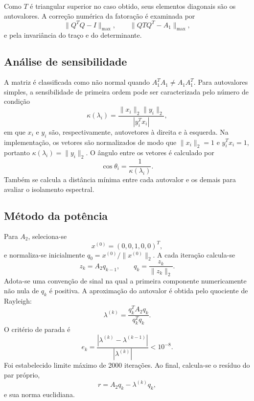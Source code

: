 Como \(T\) é triangular superior no caso obtido, seus elementos diagonais são os autovalores. A correção numérica da fatoração é examinada por
\[
\|Q^TQ-I\|_{\max},\qquad
\|QTQ^T-A_1\|_{\max},
\]
e pela invariância do traço e do determinante.

\subsection{Análise de sensibilidade}

A matriz é classificada como não normal quando \(A_1^TA_1\neq A_1A_1^T\). Para autovalores simples, a sensibilidade de primeira ordem pode ser caracterizada pelo número de condição
\[
\kappa(\lambda_i)=
\frac{\|x_i\|_2\|y_i\|_2}{|y_i^Tx_i|},
\]
em que \(x_i\) e \(y_i\) são, respectivamente, autovetores à direita e à esquerda. Na implementação, os vetores são normalizados de modo que \(\|x_i\|_2=1\) e \(y_i^Tx_i=1\), portanto \(\kappa(\lambda_i)=\|y_i\|_2\). O ângulo entre os vetores é calculado por
\[
\cos\theta_i=\frac{1}{\kappa(\lambda_i)}.
\]
Também se calcula a distância mínima entre cada autovalor e os demais para avaliar o isolamento espectral.

\subsection{Método da potência}

Para \(A_2\), seleciona-se
\[
x^{(0)}=(0,0,1,0,0)^T,
\]
e normaliza-se inicialmente \(q_0=x^{(0)}/\|x^{(0)}\|_2\). A cada iteração calcula-se
\[
z_k=A_2q_{k-1},\qquad
q_k=\frac{z_k}{\|z_k\|_2}.
\]
Adota-se uma convenção de sinal na qual a primeira componente numericamente não nula de \(q_k\) é positiva. A aproximação do autovalor é obtida pelo quociente de Rayleigh:
\[
\lambda^{(k)}=
\frac{q_k^TA_2q_k}{q_k^Tq_k}.
\]
O critério de parada é
\[
e_k=\frac{|\lambda^{(k)}-\lambda^{(k-1)}|}
{|\lambda^{(k)}|}<10^{-8}.
\]
Foi estabelecido limite máximo de 2000 iterações. Ao final, calcula-se o resíduo do par próprio,
\[
r=A_2q_k-\lambda^{(k)}q_k,
\]
e sua norma euclidiana.
